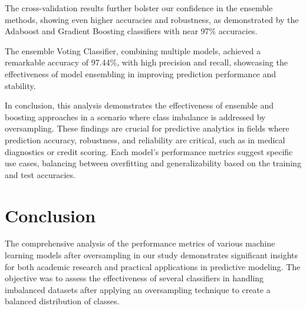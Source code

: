 \documentclass[a4paper,num-refs,gigabyte]{oup-contemporary}
\begin{document}
The cross-validation results further bolster our confidence in the ensemble methods, showing even higher accuracies and robustness, as demonstrated by the Adaboost and Gradient Boosting classifiers with near 97\% accuracies.

The ensemble Voting Classifier, combining multiple models, achieved a remarkable accuracy of 97.44\%, with high precision and recall, showcasing the effectiveness of model ensembling in improving prediction performance and stability.

In conclusion, this analysis demonstrates the effectiveness of ensemble and boosting approaches in a scenario where class imbalance is addressed by oversampling. These findings are crucial for predictive analytics in fields where prediction accuracy, robustness, and reliability are critical, such as in medical diagnostics or credit scoring. Each model’s performance metrics suggest specific use cases, balancing between overfitting and generalizability based on the training and test accuracies.



\section{Conclusion}

The comprehensive analysis of the performance metrics of various machine learning models after oversampling in our study demonstrates significant insights for both academic research and practical applications in predictive modeling. The objective was to assess the effectiveness of several classifiers in handling imbalanced datasets after applying an oversampling technique to create a balanced distribution of classes.
\end{document}

